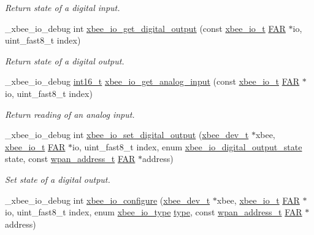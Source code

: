 \begin{DoxyCompactItemize}
\begin{DoxyCompactList}\small\item\em Return state of a digital input. \end{DoxyCompactList}\item 
\+\_\+xbee\+\_\+io\+\_\+debug int \hyperlink{group__xbee__io_ga6f3c5c657a49cd87abe13bdba3af15e9}{xbee\+\_\+io\+\_\+get\+\_\+digital\+\_\+output} (const \hyperlink{structxbee__io__t}{xbee\+\_\+io\+\_\+t} \hyperlink{group__hal_gaef060b3456fdcc093a7210a762d5f2ed}{F\+AR} $\ast$io, uint\+\_\+fast8\+\_\+t index)
\begin{DoxyCompactList}\small\item\em Return state of a digital output. \end{DoxyCompactList}\item 
\+\_\+xbee\+\_\+io\+\_\+debug \hyperlink{group__hal__dos_ga2140805d08462d474b82ddc8d1c2f3e6}{int16\+\_\+t} \hyperlink{group__xbee__io_ga69fd62a7e8b6ebd3654ba426f8aa07ab}{xbee\+\_\+io\+\_\+get\+\_\+analog\+\_\+input} (const \hyperlink{structxbee__io__t}{xbee\+\_\+io\+\_\+t} \hyperlink{group__hal_gaef060b3456fdcc093a7210a762d5f2ed}{F\+AR} $\ast$io, uint\+\_\+fast8\+\_\+t index)
\begin{DoxyCompactList}\small\item\em Return reading of an analog input. \end{DoxyCompactList}\item 
\+\_\+xbee\+\_\+io\+\_\+debug int \hyperlink{group__xbee__io_ga73696df85c4f9e52d5d24825d3a90b2a}{xbee\+\_\+io\+\_\+set\+\_\+digital\+\_\+output} (\hyperlink{structxbee__dev__t}{xbee\+\_\+dev\+\_\+t} $\ast$xbee, \hyperlink{structxbee__io__t}{xbee\+\_\+io\+\_\+t} \hyperlink{group__hal_gaef060b3456fdcc093a7210a762d5f2ed}{F\+AR} $\ast$io, uint\+\_\+fast8\+\_\+t index, enum \hyperlink{group__xbee__io_gaf104a10d2bc34550b99de92fe3564cd2}{xbee\+\_\+io\+\_\+digital\+\_\+output\+\_\+state} state, const \hyperlink{structwpan__address__t}{wpan\+\_\+address\+\_\+t} \hyperlink{group__hal_gaef060b3456fdcc093a7210a762d5f2ed}{F\+AR} $\ast$address)
\begin{DoxyCompactList}\small\item\em Set state of a digital output. \end{DoxyCompactList}\item 
\+\_\+xbee\+\_\+io\+\_\+debug int \hyperlink{group__xbee__io_ga0734acd149ca45fa8041d426f552e51a}{xbee\+\_\+io\+\_\+configure} (\hyperlink{structxbee__dev__t}{xbee\+\_\+dev\+\_\+t} $\ast$xbee, \hyperlink{structxbee__io__t}{xbee\+\_\+io\+\_\+t} \hyperlink{group__hal_gaef060b3456fdcc093a7210a762d5f2ed}{F\+AR} $\ast$io, uint\+\_\+fast8\+\_\+t index, enum \hyperlink{group__xbee__io_gac23a55c53310f865d9ed2381e331a438}{xbee\+\_\+io\+\_\+type} \hyperlink{group__zcl_ga1d127017fb298b889f4ba24752d08b8e}{type}, const \hyperlink{structwpan__address__t}{wpan\+\_\+address\+\_\+t} \hyperlink{group__hal_gaef060b3456fdcc093a7210a762d5f2ed}{F\+AR} $\ast$address)

\end{DoxyCompactItemize}
